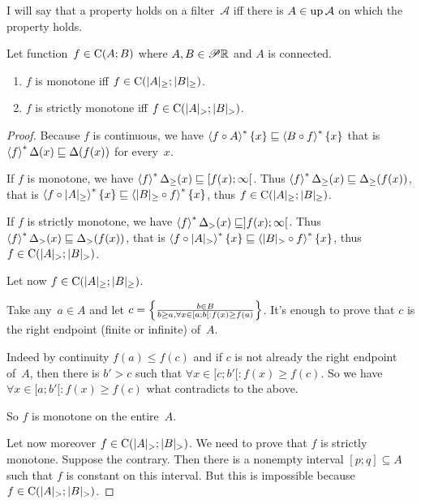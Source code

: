 I will say that a property holds on a filter~$\mathcal{A}$ iff there is $A\in\operatorname{up}\mathcal{A}$ on which the property holds.


\begin{lem}
Let function~$f\in\mathrm{C}(A;B)$ where $A,B\in\mathscr{P}\mathbb{R}$ and $A$ is connected.
\begin{enumerate}
\item $f$ is monotone iff $f\in\mathrm{C}(|A|_{\geq};|B|_{\geq})$.
\item $f$ is strictly monotone iff $f\in\mathrm{C}(|A|_{>};|B|_{>})$.
\end{enumerate}
\end{lem}

\begin{proof}
Because $f$ is continuous, we have $\left\langle f\circ A\right\rangle ^{\ast}\{x\} \sqsubseteq \left\langle B\circ f\right\rangle ^{\ast}\{x\}$
that is $\left\langle f\right\rangle ^{\ast} \Delta(x) \sqsubseteq \Delta(f(x))$ for every~$x$.

If $f$ is monotone, we have $\left\langle f\right\rangle ^{\ast} \Delta_{\geq}(x) \sqsubseteq [f(x);\infty[$.
Thus $\left\langle f\right\rangle ^{\ast} \Delta_{\geq}(x) \sqsubseteq \Delta_{\geq}(f(x))$, that is
$\left\langle f\circ |A|_{\geq}\right\rangle ^{\ast}\{x\} \sqsubseteq \left\langle |B|_{\geq}\circ f\right\rangle ^{\ast}\{x\}$, thus
$f\in\mathrm{C}(|A|_{\geq};|B|_{\geq})$.

If $f$ is strictly monotone, we have $\left\langle f\right\rangle ^{\ast} \Delta_{>}(x) \sqsubseteq ]f(x);\infty[$.
Thus $\left\langle f\right\rangle ^{\ast} \Delta_{>}(x) \sqsubseteq \Delta_{>}(f(x))$, that is
$\left\langle f\circ |A|_{>}\right\rangle ^{\ast}\{x\} \sqsubseteq \left\langle |B|_{>}\circ f\right\rangle ^{\ast}\{x\}$, thus
$f\in\mathrm{C}(|A|_{>};|B|_{>})$.

Let now $f\in\mathrm{C}(|A|_{\geq};|B|_{\geq})$.

Take any~$a\in A$ and let $c=\left\{ \frac{b\in B}{b\geq a, \forall x\in[a;b[: f(x)\geq f(a)}\right\}$.
It's enough to prove that $c$ is the right endpoint (finite or infinite) of~$A$.

Indeed by continuity $f(a)\leq f(c)$ and if $c$ is not already the right endpoint of~$A$, then
there is $b'>c$ such that $\forall x\in[c;b'[: f(x)\geq f(c)$.
So we have $\forall x\in[a;b'[: f(x)\geq f(c)$ what contradicts to the above.

So $f$ is monotone on the entire~$A$.

Let now moreover $f\in\mathrm{C}(|A|_{>};|B|_{>})$. We need to prove that $f$ is strictly monotone.
Suppose the contrary. Then there is a nonempty interval $[p;q]\subseteq A$ such that $f$ is constant on this interval.
But this is impossible because $f\in\mathrm{C}(|A|_{>};|B|_{>})$.
\end{proof}

